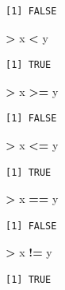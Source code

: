 \documentclass[11pt,a4paper]{book}
\newenvironment{Shaded}{\begin{snugshade}}{\end{snugshade}}
\newcommand{\StringTok}[1]{\textcolor[rgb]{0.31,0.60,0.02}{#1}}
\newcommand{\OperatorTok}[1]{\textcolor[rgb]{0.81,0.36,0.00}{\textbf{#1}}}
\newcommand{\NormalTok}[1]{#1}
\theoremstyle{definition}
\theoremstyle{definition}
\theoremstyle{definition}
\theoremstyle{remark}
\begin{document}
\begin{verbatim}
[1] FALSE
\end{verbatim}

\begin{Shaded}
\begin{Highlighting}[]
\OperatorTok{>}\StringTok{ }\NormalTok{x }\OperatorTok{<}\StringTok{ }\NormalTok{y}
\end{Highlighting}
\end{Shaded}

\begin{verbatim}
[1] TRUE
\end{verbatim}

\begin{Shaded}
\begin{Highlighting}[]
\OperatorTok{>}\StringTok{ }\NormalTok{x }\OperatorTok{>=}\StringTok{ }\NormalTok{y}
\end{Highlighting}
\end{Shaded}

\begin{verbatim}
[1] FALSE
\end{verbatim}

\begin{Shaded}
\begin{Highlighting}[]
\OperatorTok{>}\StringTok{ }\NormalTok{x }\OperatorTok{<=}\StringTok{ }\NormalTok{y}
\end{Highlighting}
\end{Shaded}

\begin{verbatim}
[1] TRUE
\end{verbatim}

\begin{Shaded}
\begin{Highlighting}[]
\OperatorTok{>}\StringTok{ }\NormalTok{x }\OperatorTok{==}\StringTok{ }\NormalTok{y}
\end{Highlighting}
\end{Shaded}

\begin{verbatim}
[1] FALSE
\end{verbatim}

\begin{Shaded}
\begin{Highlighting}[]
\OperatorTok{>}\StringTok{ }\NormalTok{x }\OperatorTok{!=}\StringTok{ }\NormalTok{y}
\end{Highlighting}
\end{Shaded}

\begin{verbatim}
[1] TRUE
\end{verbatim}
\end{document}
